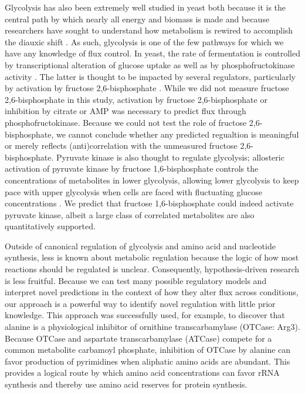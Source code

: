 Glycolysis has also been extremely well studied in yeast both because it is the central path by which nearly all energy and biomass is made and because researchers have sought to understand how metabolism is rewired to accomplish the diauxic shift \cite{Zampar:2013fr}. As such, glycolysis is one of the few pathways for which we have any knowledge of flux control.  In yeast, the rate of fermentation is controlled by transcriptional alteration of glucose uptake as well as by phosphofructokinase activity \cite{Cortassa:1994is, Pritchard:2002ft}.  The latter is thought to be impacted by several regulators, particularly by activation by fructose 2,6-bisphosphate \cite{Cortassa:1994is, vanEunen:2012cr}. While we did not measure fructose 2,6-bisphosphate in this study, activation by fructose 2,6-bisphosphate or inhibition by citrate or AMP was necessary to predict flux through phosphofructokinase. Because we could not test the role of fructose 2,6-bisphosphate, we cannot conclude whether any predicted regualtion is meaningful or merely reflects (anti)correlation with the unmeasured fructose 2,6-bisphosphate. Pyruvate kinase is also thought to regulate glycolysis; allosteric activation of pyruvate kinase by fructose 1,6-bisphosphate controls the concentrations of metabolites in lower glycolysis, allowing lower glycolysis to keep pace with upper glycolysis when cells are faced with fluctuating glucose concentrations \cite{Xu:2012gg}. We predict that fructose 1,6-bisphosphate could indeed activate pyruvate kinase, albeit a large class of correlated metabolites are also quantitatively supported.

Outside of canonical regulation of glycolysis and amino acid and nucleotide synthesis, less is known about metabolic regulation because the logic of how most reactions should be regulated is unclear. Consequently, hypothesis-driven research is less fruitful. Because we can test many possible regulatory models and interpret novel predictions in the context of how they alter flux across conditions, our approach is a powerful way to identify novel regulation with little prior knowledge.  This approach was successfully used, for example, to discover that alanine is a physiological inhibitor of ornithine transcarbamylase (OTCase: Arg3).  Because OTCase and aspartate transcarbamylase (ATCase) compete for a common metabolite carbamoyl phosphate, inhibition of OTCase by alanine can favor production of pyrimidines when aliphatic amino acids are abundant.  This provides a logical route by which amino acid concentrations can favor rRNA synthesis and thereby use amino acid reserves for protein synthesis.  

